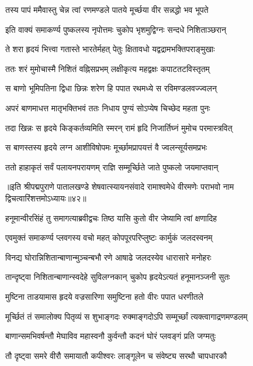 \twolineshloka
{तस्य पापं ममैवास्तु चेन्न त्वां रणमण्डले}
{पातये मूर्च्छया वीर सन्नद्धो भव भूपते}%

\twolineshloka
{इति वाक्यं समाकर्ण्य पुष्कलस्य नृपोत्तमः}
{चुकोप भृशमुद्विग्नः सन्दधे निशिताञ्छरान्}%

\twolineshloka
{ते शरा हृदयं भित्त्वा गतास्ते भारतेर्महत्}
{पेतुः क्षितावधो यद्वद्रामभक्तिपराङ्मुखाः}%

\twolineshloka
{ततः शरं मुमोचास्मै निशितं वह्निसप्रभम्}
{लक्षीकृत्य महद्वक्षः कपाटतटविस्तृतम्}%

\twolineshloka
{स बाणो भूमिपतिना द्विधा छिन्नः शरेण हि}
{पपात रथमध्ये स रविमण्डलवज्ज्वलन्}%

\twolineshloka
{अपरं बाणमाधत्त मातृभक्तिभवं ततः}
{निधाय पुण्यं सोऽप्येष चिच्छेद महता पुनः}%

\twolineshloka
{तदा खिन्नः स हृदये किङ्कर्तव्यमिति स्मरन्}
{रामं हृदि निजार्तिघ्नं मुमोच परमास्त्रवित्}%

\twolineshloka
{स बाणस्तस्य हृदये लग्न आशीविषोपमः}
{मूर्च्छामप्रापयत्तं वै ज्वलन्सूर्यसमप्रभः}%

\twolineshloka
{ततो हाहाकृतं सर्वं पलायनपरायणम्}
{राज्ञि सम्मूर्च्छिते जाते पुष्कलो जयमाप्तवान्}%

{॥इति श्रीपद्मपुराणे पातालखण्डे शेषवात्स्यायनसंवादे रामाश्वमेधे वीरमणेः पराभवो नाम द्विचत्वारिंशत्तमोऽध्यायः॥४२॥}



\twolineshloka
{हनूमान्वीरसिंहं तु समागत्याब्रवीद्वचः}
{तिष्ठ यासि कुतो वीर जेष्यामि त्वां क्षणादिह}%

\twolineshloka
{एवमुक्तं समाकर्ण्य प्लवगस्य वचो महत्}
{कोपपूरपरिप्लुष्टः कार्मुकं जलदस्वनम्}%

\twolineshloka
{विनद्य घोरान्निशितान्बाणान्मुञ्चन्बभौ रणे}
{आषाढे जलदस्येव धारासारे मनोहरः}%

\twolineshloka
{तान्दृष्ट्वा निशितान्बाणान्स्वदेहे सुविलग्नकान्}
{चुकोप हृदयेऽत्यतं हनूमानञ्जनी सुतः}%

\twolineshloka
{मुष्टिना ताडयामास हृदये वज्रसारिणा}
{समुष्टिना हतो वीरः पपात धरणीतले}%

\twolineshloka
{मूर्च्छितं तं समालोक्य पितृव्यं स शुभाङ्गदः}
{रुक्माङ्गदोऽपि सम्मूर्च्छां त्यक्त्वागाद्रणमण्डलम्}%

\twolineshloka
{बाणान्समभिवर्षन्तौ मेघाविव महास्वनौ}
{कुर्वन्तौ कदनं घोरं प्लवङ्गं प्रति जग्मतुः}%

\twolineshloka
{तौ दृष्ट्वा समरे वीरौ समायातौ कपीश्वरः}
{लाङ्गूलेन च संवेष्ट्य सरथौ चापधारकौ}%


